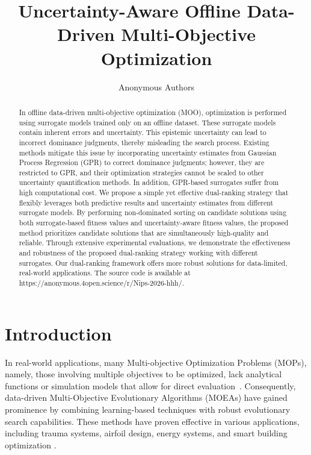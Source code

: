 \documentclass{article}
\title{Uncertainty-Aware Offline Data-Driven Multi-Objective Optimization}
\author{Anonymous Authors}
\begin{document}
\maketitle


\begin{abstract}
In offline data-driven multi-objective optimization (MOO), optimization is performed using surrogate models trained only on an offline dataset. These surrogate models contain inherent errors and uncertainty. This epistemic uncertainty can lead to incorrect dominance judgments, thereby misleading the search process. Existing methods mitigate this issue by incorporating uncertainty estimates from Gaussian Process Regression (GPR) to correct dominance judgments; however, they are restricted to GPR, and their optimization strategies cannot be scaled to other uncertainty quantification methods. In addition, GPR-based surrogates suffer from high computational cost. We propose a simple yet effective dual-ranking strategy that flexibly leverages both predictive results and uncertainty estimates from different surrogate models. By performing non-dominated sorting on candidate solutions using both surrogate-based fitness values and uncertainty-aware fitness values, the proposed method prioritizes candidate solutions that are simultaneously high-quality and reliable. Through extensive experimental evaluations, we demonstrate the effectiveness and robustness of the proposed dual-ranking strategy working with different surrogates. Our dual-ranking framework offers more robust solutions for data-limited, real-world applications. The source code is available at https://anonymous.4open.science/r/Nips-2026-hhh/.
\end{abstract}



\section{Introduction}
In real-world applications, many Multi-objective Optimization Problems (MOPs), namely, those involving multiple objectives to be optimized, lack analytical functions or simulation models that allow for direct evaluation~\cite{ddeo_rvea}. Consequently, data-driven Multi-Objective Evolutionary Algorithms (MOEAs) have gained prominence by combining learning-based techniques with robust evolutionary search capabilities. These methods have proven effective in various applications, including trauma systems, airfoil design, energy systems, and smart building optimization \cite{ddeo_1,ddeo_2,ddeo_ibea,building_opt2}.
\end{document}
